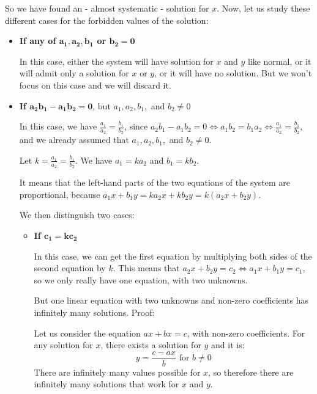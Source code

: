 \documentclass[11pt]{article}
\begin{document}
So we have found an - almost  systematic - solution for $x$. Now, let us study these different cases for the forbidden values of the solution:

\begin{itemize}

\item \textbf{If any of  $\mathbf{a_1, a_2, b_1}$ or $\mathbf{b_2 = 0}$}

    In this case, either the system will have solution for $x$ and $y$ like normal, or
    it will admit only a solution for $x$ or $y$, or it will have no solution.
    But we won't focus on this case and we will discard it.
    
\item \textbf{If $\mathbf{a_2 b_1 - a_1 b_2 = 0}$}, but $a_1, a_2, b_1,$ and $b_2 \neq 0$
    
    In this case, we have $\displaystyle \frac{a_1}{a_2} = \frac{b_1}{b_2}$, since
    $\displaystyle a_2 b_1 - a_1 b_2 = 0 \iff  a_1 b_2 = b_1 a_2
    \iff \frac{a_1}{a_2} = \frac{b_1}{b_2}$, and we already assumed that $a_1, a_2, b_1,$ and $b_2 \neq 0$.
    
    Let $\displaystyle k = \frac{a_1}{a_2} = \frac{b_1}{b_2}$.
    We have $a_1 = k a_2$ and $b_1 = k b_2$.

    It means that the left-hand parts of the two equations of the system are proportional, because $a_1 x + b_1 y = k a_2 x + k b_2 y = k (a_2 x + b_2 y)$.
    
    We then distinguish two cases:
    
    \begin{itemize}
    
    \item \textbf{If $\mathbf{c_1 = k c_2}$}
    
        In this case, we can get the first equation by multiplying both sides of the second equation by $k$. This means that $a_2 x + b_2 y = c_2 \iff a_1 x + b_1 y = c_1$,
        so we only really have one equation, with two unknowns.
        
        But one linear equation with two unknowns and non-zero coefficients has infinitely many solutions.
        Proof:
        
        Let us consider the equation $a x + b x = c$, with non-zero coefficients.
        For any solution for $x$, there exists a solution for $y$ and it is:
        \[y = \frac{c - a x}{b} \text{ for } b \neq 0\]
        There are infinitely many values possible for $x$, so therefore there are infinitely many solutions that work for $x$ and $y$.
        

\end{itemize}
\end{itemize}
\end{document}
